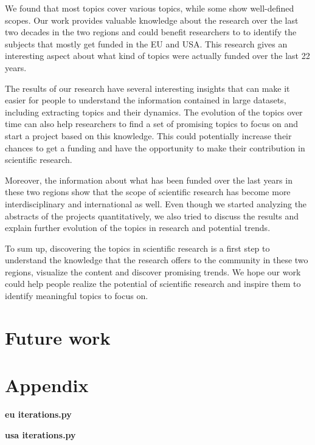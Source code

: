 \documentclass[12pt]{report}
\begin{document}
We found that most topics cover various topics, while some show well-defined
scopes. Our work provides valuable knowledge about the research over the last
two decades in the two regions and could benefit researchers to to identify the
subjects that mostly get funded in the EU and USA. This research gives an
interesting aspect about what kind of topics were actually funded over the last
22 years.

The results of our research have several interesting insights that can make it
easier for people to understand the information contained in large datasets,
including extracting topics and their dynamics. The evolution of the topics over
time can also help researchers to find a set of promising topics to focus on and
start a project based on this knowledge. This could potentially increase their
chances to get a funding and have the opportunity to make their contribution in
scientific research.

Moreover, the information about what has been funded over the last years in
these two regions show that the scope of scientific research has become more
interdisciplinary and international as well. Even though we started analyzing
the abstracts of the projects quantitatively, we also tried to discuss the
results and explain further evolution of the topics in research and potential
trends.

To sum up, discovering the topics in scientific research is a first step to
understand the knowledge that the research offers to the community in these two
regions, visualize the content and discover promising trends. We hope our work
could help people realize the potential of scientific research and inspire them
to identify meaningful topics to focus on.

\section{Future work}

{}



\clearpage
\section{Appendix}

\textbf{eu iterations.py}



\textbf{usa iterations.py}


\end{document}

